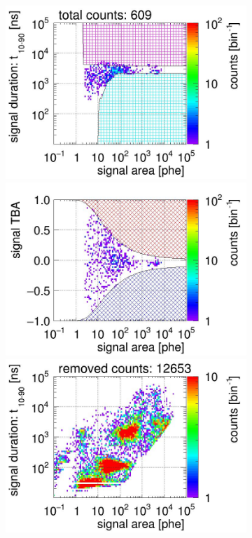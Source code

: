 \begin{landscape}
\begin{figure}[!p]
\begin{subfigure}[t]{0.33\textwidth}
			\includegraphics[width=\figurewidth,clip,trim={0 98 0 0}]{Figures/GasTest/CutsValid/res64765/pdpa23Vecfig64765.jpg}
			\includegraphics[width=\figurewidth,clip,trim={0 98 0 40}]{Figures/GasTest/CutsValid/res64765/tbapa23Vecfig64765.jpg}
			\includegraphics[width=\figurewidth,clip,trim={0 98 0 10}]{Figures/GasTest/CutsValid/res64765/pdpaX23Vecfig64765.jpg}

\end{subfigure}
\end{figure}
\end{landscape}
